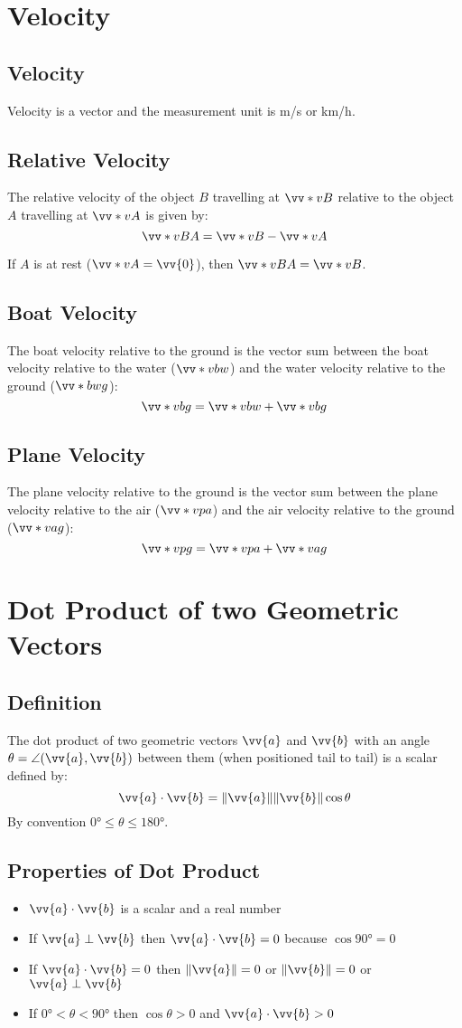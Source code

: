 	\section{Velocity}
		\subsection{Velocity}
			Velocity is a vector and the measurement unit is \si{\m/\s} or \si{\km/\hour}.
		\subsection{Relative Velocity}
			The relative velocity of the object $B$ travelling at $\vv*{v}{B}$ relative to the object $A$ travelling at $\vv*{v}{A}$ is given by:
			\[\vv*{v}{BA} = \vv*{v}{B} - \vv*{v}{A}\]

			If $A$ is at rest ($\vv*{v}{A} = \vv{0}$), then $\vv*{v}{BA} = \vv*{v}{B}$.
		\subsection{Boat Velocity}
			The boat velocity relative to the ground is the vector sum between the boat velocity relative to the water ($\vv*{v}{bw}$) and the water velocity relative to the ground ($\vv*{b}{wg}$):
			\[\vv*{v}{bg} = \vv*{v}{bw} + \vv*{v}{bg}\]
		\subsection{Plane Velocity}
			The plane velocity relative to the ground is the vector sum between the plane velocity relative to the air ($\vv*{v}{pa}$) and the air velocity relative to the ground ($\vv*{v}{ag}$):
			\[\vv*{v}{pg} = \vv*{v}{pa} + \vv*{v}{ag}\]
	\section{Dot Product of two Geometric Vectors}
		\subsection{Definition}
			The dot product of two geometric vectors $\vv{a}$ and $\vv{b}$ with an angle $\theta = \angle(\vv{a}, \vv{b})$ between them (when positioned tail to tail) is a scalar defined by:
			\[\vv{a} \cdot \vv{b} = \|\vv{a}\|\|\vv{b}\|\cos\theta\]
			By convention $\ang{0} \leq \theta \leq \ang{180}$.
		\subsection{Properties of Dot Product}
			\begin{itemize}
				\item $\vv{a} \cdot \vv{b}$ is a scalar and a real number
				\item If $\vv{a} \perp \vv{b}$ then $\vv{a} \cdot \vv{b} = 0$ because $\cos\ang{90} = 0$
				\item If $\vv{a} \cdot \vv{b} = 0$ then $\|\vv{a}\| = 0$ or $\|\vv{b}\| = 0$ or $\vv{a} \perp \vv{b}$
				\item If $\ang{0} < \theta < \ang{90}$ then $\cos\theta > 0$ and $\vv{a} \cdot \vv{b} > 0$
			\end{itemize}

